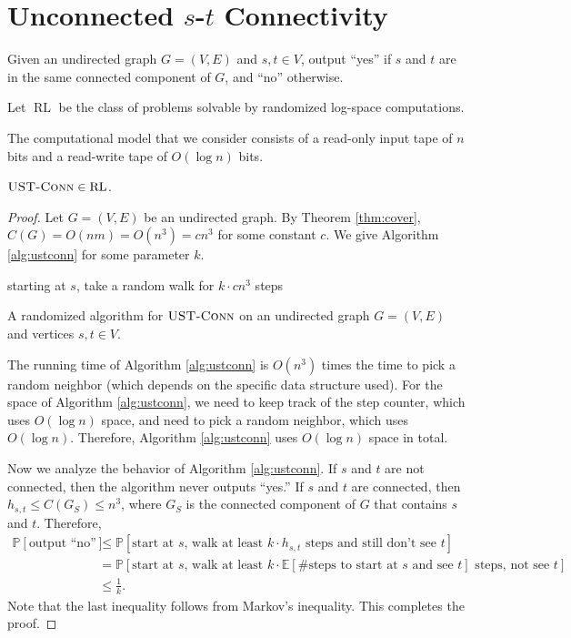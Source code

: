 \documentclass[letterpaper, reqno,11pt]{article}
\newcommand{\PP}{\mathbb{P}}
\newcommand{\EE}{\mathbb{E}}
\DeclareMathOperator{\ustconn}{\textsc{UST-Conn}}
\DeclareMathOperator{\RL}{RL}
\begin{document}
\section{Unconnected $s$-$t$ Connectivity}

\begin{problem}[undirected $s$-$t$ connectivity, $\ustconn$]
  Given an undirected graph $G = (V, E)$ and $s, t \in V$, output ``yes'' if $s$ and $t$ are in the same connected component of $G$, and ``no'' otherwise.
\end{problem}

\begin{definition}
  Let $\RL$ be the class of problems solvable by randomized log-space computations.
\end{definition}

The computational model that we consider consists of a read-only input tape of $n$ bits and a read-write tape of $O(\log n)$ bits.

\begin{theorem}
  $\ustconn \in \RL$.
\end{theorem}

\begin{proof}
  Let $G = (V, E)$ be an undirected graph. By Theorem \ref{thm:cover}, $C(G) = O(nm) = O(n^3) = cn^3$ for some constant $c$. We give Algorithm \ref{alg:ustconn} for some parameter $k$.

  \begin{algorithm}
    starting at $s$, take a random walk for $k \cdot c n^3$ steps \\
    \caption{A randomized algorithm for $\ustconn$ on an undirected graph $G = (V, E)$ and vertices $s, t \in V$.}
    \label{alg:ustconn}
  \end{algorithm}

  The running time of Algorithm \ref{alg:ustconn} is $O(n^3)$ times the time to pick a random neighbor (which depends on the specific data structure used). For the space of Algorithm \ref{alg:ustconn}, we need to keep track of the step counter, which uses $O(\log n)$ space, and need to pick a random neighbor, which uses $O(\log n)$. Therefore, Algorithm \ref{alg:ustconn} uses $O(\log n)$ space in total.

  Now we analyze the behavior of Algorithm \ref{alg:ustconn}. If $s$ and $t$ are not connected, then the algorithm never outputs ``yes.'' If $s$ and $t$ are connected, then $h_{s, t} \leq C(G_S) \leq n^3$, where $G_S$ is the connected component of $G$ that contains $s$ and $t$. Therefore,
  \begin{align*}
    \PP[\text{output ``no''}] &\leq \PP[\text{start at $s$, walk at least $k \cdot h_{s, t}$ steps and still don't see $t$}] \\
    &= \PP[\text{start at $s$, walk at least $k \cdot \EE[\text{\# steps to start at $s$ and see $t$}]$ steps, not see $t$}] \\
    &\leq \frac{1}{k}.
  \end{align*}
  Note that the last inequality follows from Markov's inequality. This completes the proof.
\end{proof}
\end{document}
